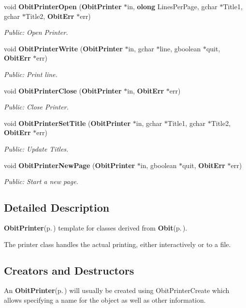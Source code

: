 \begin{CompactItemize}
void {\bf Obit\-Printer\-Open} ({\bf Obit\-Printer} $\ast$in, {\bf olong} Lines\-Per\-Page, gchar $\ast$Title1, gchar $\ast$Title2, {\bf Obit\-Err} $\ast$err)
\begin{CompactList}\small\item\em Public: Open Printer. \item\end{CompactList}\item 
void {\bf Obit\-Printer\-Write} ({\bf Obit\-Printer} $\ast$in, gchar $\ast$line, gboolean $\ast$quit, {\bf Obit\-Err} $\ast$err)
\begin{CompactList}\small\item\em Public: Print line. \item\end{CompactList}\item 
void {\bf Obit\-Printer\-Close} ({\bf Obit\-Printer} $\ast$in, {\bf Obit\-Err} $\ast$err)
\begin{CompactList}\small\item\em Public: Close Printer. \item\end{CompactList}\item 
void {\bf Obit\-Printer\-Set\-Title} ({\bf Obit\-Printer} $\ast$in, gchar $\ast$Title1, gchar $\ast$Title2, {\bf Obit\-Err} $\ast$err)
\begin{CompactList}\small\item\em Public: Update Titles. \item\end{CompactList}\item 
void {\bf Obit\-Printer\-New\-Page} ({\bf Obit\-Printer} $\ast$in, gboolean $\ast$quit, {\bf Obit\-Err} $\ast$err)
\begin{CompactList}\small\item\em Public: Start a new page. \item\end{CompactList}\end{CompactItemize}


\subsection{Detailed Description}
{\bf Obit\-Printer}{\rm (p.\,\pageref{structObitPrinter})} template for classes derived from {\bf Obit}{\rm (p.\,\pageref{structObit})}. 

The printer class handles the actual printing, either interactively or to a file.\subsection{Creators and Destructors}\label{ObitPrinter_8h_ObitPrinteraccess}
An {\bf Obit\-Printer}{\rm (p.\,\pageref{structObitPrinter})} will usually be created using Obit\-Printer\-Create which allows specifying a name for the object as well as other information.

